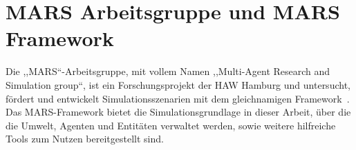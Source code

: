 %
%
\section{MARS Arbeitsgruppe und MARS Framework}\label{sec:mars-arbeitsgruppe-und-mars-framework}

Die ,,MARS``-Arbeitsgruppe, mit vollem Namen ,,Multi-Agent Research and Simulation group``, ist ein Forschungsprojekt der HAW Hamburg und untersucht, fördert und entwickelt Simulationsszenarien mit dem gleichnamigen Framework~\cite{Mars2023}.
Das MARS-Framework bietet die Simulationsgrundlage in dieser Arbeit, über die die Umwelt, Agenten und Entitäten verwaltet werden, sowie weitere hilfreiche Tools zum Nutzen bereitgestellt sind.
